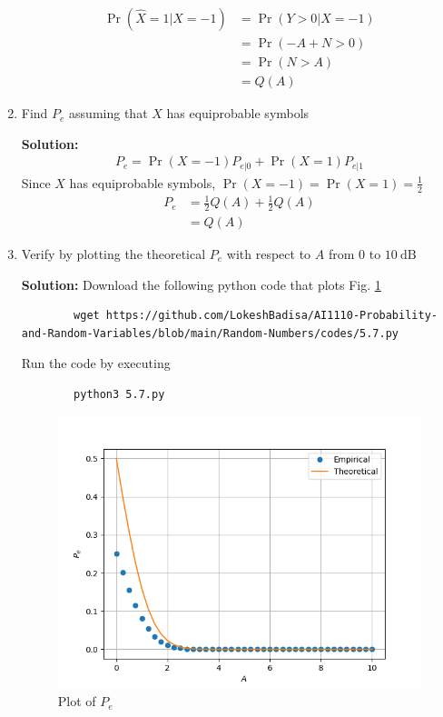 \documentclass[journal,12pt,twocolumn]{IEEEtran}
\newcommand{\solution}{\noindent \textbf{Solution: }}
\providecommand{\pr}[1]{\ensuremath{\Pr\left(#1\right)}}
\numberwithin{equation}{section}
\renewcommand\thesection{\arabic{section}}
\begin{document}
\begin{enumerate}[label=\thesection.\arabic*,ref=\thesection.\theenumi]
	\begin{align}
		\pr{\hat{X}=1|X=-1} &= \pr{Y>0|X=-1} \\
		&= \pr{-A+N>0} \\
		&= \pr{N>A} \\
		&= Q(A)		
	\end{align}
	
	\item Find $P_e$ assuming that $X$ has equiprobable symbols
	
	\solution 
	\begin{align}
		P_e = \pr{X=-1} P_{e|0} + \pr{X=1} P_{e|1}
	\end{align}
	Since $X$ has equiprobable symbols, $\pr{X=-1} = \pr{X=1} = \frac12$
	\begin{align}
		P_e &= \frac12 Q(A) + \frac12 Q(A) \\
		&= Q(A)	
	\end{align}		
	
	\item Verify by plotting the theoretical $P_e$ with respect to $A$ from $0$ to $10 ~\mathrm{dB}$
	
	\solution Download the following python code that plots Fig. \ref{fig-5.7}
	\begin{lstlisting}
		wget https://github.com/LokeshBadisa/AI1110-Probability-and-Random-Variables/blob/main/Random-Numbers/codes/5.7.py
	\end{lstlisting}
	Run the code by executing
	\begin{lstlisting}
		python3 5.7.py
	\end{lstlisting}
	\begin{figure}
		\centering
		\includegraphics[width=\columnwidth]{./figs/5.7.png}
		\caption{Plot of $P_e$}
		\label{fig-5.7}
	\end{figure}
	

\end{enumerate}
\end{document}
